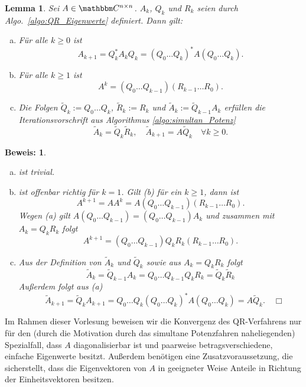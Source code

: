 \documentclass[12pt,a4paper]{book}
\theoremstyle{break}
\newtheorem{lemma}[theorem]{Lemma}
\theoremstyle{nonumberplain}
\newtheorem{beweis}{Beweis:}
\newcommand{\C}{\mathbbm C}
\newcommand{\1}{\mathbbm{1}} 			      	%
\begin{document}
\begin{lemma}\label{lemma_QR_hilf}
Sei $A\in \C^{n\times n}$. %
$A_k$, $Q_k$ und $R_k$ seien durch Algo.~\ref{algo:QR_Eigenwerte} definiert. Dann gilt:
\begin{enumerate}[(a)]
\item Für alle $k\geq 0$ ist 
\[
A_{k+1}=Q_k^* A_k Q_k=(Q_0 \ldots Q_k)^* A (Q_0 \ldots Q_k).
\]
\item Für alle $k\geq 1 $ ist 
\[
A^k=(Q_0 \dots Q_{k-1})(R_{k-1} \dots R_0).
\]
\item Die Folgen $\tilde Q_k:=Q_0\dots Q_{k}$, $\tilde R_k:=R_k$ und $\tilde A_k:=\tilde Q_{k-1} A_k$ erfüllen
die Iterationsvorschrift aus Algorithmus \ref{algo:simultan_Potenz}
\[
\tilde A_k=\tilde Q_k \tilde R_k, \quad \tilde A_{k+1}=A \tilde Q_k \quad \forall k\geq 0.
\]
\end{enumerate}
\end{lemma}
\begin{beweis}
\begin{enumerate}[(a)]
\item ist trivial.
\item ist offenbar richtig für $k=1$. Gilt (b) für ein $k\geq 1$, dann ist
\[
A^{k+1}=A A^k = A (Q_0 \dots Q_{k-1})(R_{k-1} \dots R_0).
\]
Wegen (a) gilt $A (Q_0 \dots Q_{k-1})=(Q_0 \dots Q_{k-1}) A_k$ und zusammen mit $A_k=Q_k R_k$ folgt
\[
A^{k+1}=(Q_0 \dots Q_{k-1}) Q_k R_k (R_{k-1} \dots R_0).
\]
\item Aus der Definition von $\tilde A_k$ und $\tilde Q_k$ sowie aus $A_k=Q_kR_k$ folgt
\[
\tilde A_k=\tilde Q_{k-1} A_k= Q_0\dots Q_{k-1} Q_k R_k = \tilde Q_k \tilde R_k
\]
Außerdem folgt aus (a)
\[
\quad \tilde A_{k+1}=\tilde Q_k A_{k+1}=Q_0\dots Q_{k} (Q_0 \ldots Q_{k})^* A (Q_0 \ldots Q_{k})=A \tilde Q_k. \quad \Box
\]
\end{enumerate}
\end{beweis}

Im Rahmen dieser Vorlesung beweisen wir die Konvergenz des QR-Verfahrens nur für den (durch die Motivation durch das
simultane Potenzfahren naheliegenden) Spezialfall, dass $A$ diagonalisierbar ist
und paarweise betragsverschiedene, einfache Eigenwerte besitzt. Außerdem benötigen eine Zusatzvoraussetzung, die
sicherstellt, dass die Eigenvektoren von $A$ in geeigneter Weise Anteile in Richtung der Einheitsvektoren
besitzen.
\end{document}
